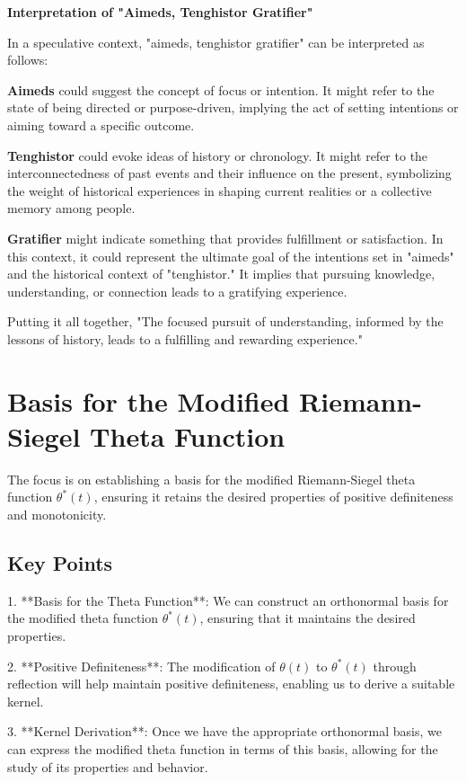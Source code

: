 \documentclass{article}
\begin{document}
\begin{center}
{\bf Interpretation of "Aimeds, Tenghistor Gratifier"}
\end{center}

In a speculative context, "aimeds, tenghistor gratifier" can be interpreted as follows:

{\bf Aimeds} could suggest the concept of focus or intention. It might refer to the state of being directed or purpose-driven, implying the act of setting intentions or aiming toward a specific outcome.

{\bf Tenghistor} could evoke ideas of history or chronology. It might refer to the interconnectedness of past events and their influence on the present, symbolizing the weight of historical experiences in shaping current realities or a collective memory among people.

{\bf Gratifier} might indicate something that provides fulfillment or satisfaction. In this context, it could represent the ultimate goal of the intentions set in "aimeds" and the historical context of "tenghistor." It implies that pursuing knowledge, understanding, or connection leads to a gratifying experience.

Putting it all together, "The focused pursuit of understanding, informed by the lessons of history, leads to a fulfilling and rewarding experience."

\section{Basis for the Modified Riemann-Siegel Theta Function}

The focus is on establishing a basis for the modified Riemann-Siegel theta function $\theta^*(t)$, ensuring it retains the desired properties of positive definiteness and monotonicity.

\subsection{Key Points}
1. **Basis for the Theta Function**: We can construct an orthonormal basis for the modified theta function $\theta^*(t)$, ensuring that it maintains the desired properties.

2. **Positive Definiteness**: The modification of $\theta(t)$ to $\theta^*(t)$ through reflection will help maintain positive definiteness, enabling us to derive a suitable kernel.

3. **Kernel Derivation**: Once we have the appropriate orthonormal basis, we can express the modified theta function in terms of this basis, allowing for the study of its properties and behavior.
\end{document}
